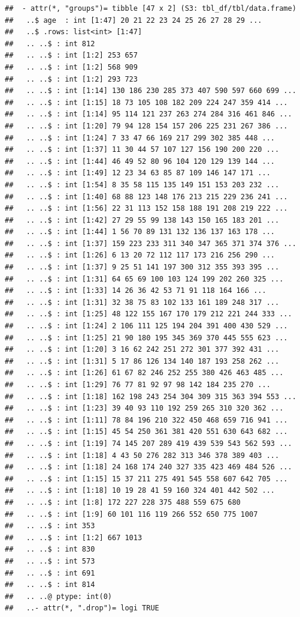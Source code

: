 \documentclass[
]{article}
\begin{document}
\begin{verbatim}
##  - attr(*, "groups")= tibble [47 x 2] (S3: tbl_df/tbl/data.frame)
##   ..$ age  : int [1:47] 20 21 22 23 24 25 26 27 28 29 ...
##   ..$ .rows: list<int> [1:47] 
##   .. ..$ : int 812
##   .. ..$ : int [1:2] 253 657
##   .. ..$ : int [1:2] 568 909
##   .. ..$ : int [1:2] 293 723
##   .. ..$ : int [1:14] 130 186 230 285 373 407 590 597 660 699 ...
##   .. ..$ : int [1:15] 18 73 105 108 182 209 224 247 359 414 ...
##   .. ..$ : int [1:14] 95 114 121 237 263 274 284 316 461 846 ...
##   .. ..$ : int [1:20] 79 94 128 154 157 206 225 231 267 386 ...
##   .. ..$ : int [1:24] 7 33 47 66 169 217 299 302 385 448 ...
##   .. ..$ : int [1:37] 11 30 44 57 107 127 156 190 200 220 ...
##   .. ..$ : int [1:44] 46 49 52 80 96 104 120 129 139 144 ...
##   .. ..$ : int [1:49] 12 23 34 63 85 87 109 146 147 171 ...
##   .. ..$ : int [1:54] 8 35 58 115 135 149 151 153 203 232 ...
##   .. ..$ : int [1:40] 68 88 123 148 176 213 215 229 236 241 ...
##   .. ..$ : int [1:56] 22 31 113 152 158 188 191 208 219 222 ...
##   .. ..$ : int [1:42] 27 29 55 99 138 143 150 165 183 201 ...
##   .. ..$ : int [1:44] 1 56 70 89 131 132 136 137 163 178 ...
##   .. ..$ : int [1:37] 159 223 233 311 340 347 365 371 374 376 ...
##   .. ..$ : int [1:26] 6 13 20 72 112 117 173 216 256 290 ...
##   .. ..$ : int [1:37] 9 25 51 141 197 300 312 355 393 395 ...
##   .. ..$ : int [1:31] 64 65 69 100 103 124 199 202 260 325 ...
##   .. ..$ : int [1:33] 14 26 36 42 53 71 91 118 164 166 ...
##   .. ..$ : int [1:31] 32 38 75 83 102 133 161 189 248 317 ...
##   .. ..$ : int [1:25] 48 122 155 167 170 179 212 221 244 333 ...
##   .. ..$ : int [1:24] 2 106 111 125 194 204 391 400 430 529 ...
##   .. ..$ : int [1:25] 21 90 180 195 345 369 370 445 555 623 ...
##   .. ..$ : int [1:20] 3 16 62 242 251 272 301 377 392 431 ...
##   .. ..$ : int [1:31] 5 17 86 126 134 140 187 193 258 262 ...
##   .. ..$ : int [1:26] 61 67 82 246 252 255 380 426 463 485 ...
##   .. ..$ : int [1:29] 76 77 81 92 97 98 142 184 235 270 ...
##   .. ..$ : int [1:18] 162 198 243 254 304 309 315 363 394 553 ...
##   .. ..$ : int [1:23] 39 40 93 110 192 259 265 310 320 362 ...
##   .. ..$ : int [1:11] 78 84 196 210 322 450 468 659 716 941 ...
##   .. ..$ : int [1:15] 45 54 250 361 381 420 551 630 643 682 ...
##   .. ..$ : int [1:19] 74 145 207 289 419 439 539 543 562 593 ...
##   .. ..$ : int [1:18] 4 43 50 276 282 313 346 378 389 403 ...
##   .. ..$ : int [1:18] 24 168 174 240 327 335 423 469 484 526 ...
##   .. ..$ : int [1:15] 15 37 211 275 491 545 558 607 642 705 ...
##   .. ..$ : int [1:18] 10 19 28 41 59 160 324 401 442 502 ...
##   .. ..$ : int [1:8] 172 227 228 375 488 559 675 680
##   .. ..$ : int [1:9] 60 101 116 119 266 552 650 775 1007
##   .. ..$ : int 353
##   .. ..$ : int [1:2] 667 1013
##   .. ..$ : int 830
##   .. ..$ : int 573
##   .. ..$ : int 691
##   .. ..$ : int 814
##   .. ..@ ptype: int(0) 
##   ..- attr(*, ".drop")= logi TRUE
\end{verbatim}
\end{document}
